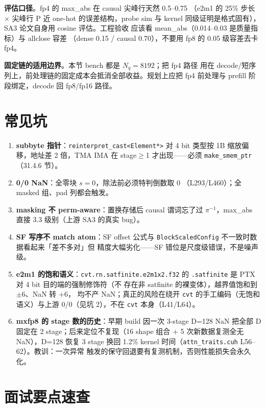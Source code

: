 \textbf{评估口径}。fp4 的 max\_abs 在 causal 尖峰行天然 0.5--0.75
（e2m1 的 25\% 步长 × 尖峰行 P 近 one-hot 的误差结构，probe sim 与
kernel 同级证明是格式固有），SA3 论文自身用 cosine 评估。工程验收
应该看 mean\_abs（0.014--0.03 是质量指标）与 allclose 容差
（dense 0.15 / causal 0.70），不要用 fp8 的 0.05 级容差去卡 fp4。

\textbf{固定链的适用边界}。本节 bench 都是 $N_q{=}8192$；把 fp4 路径
用在 decode/短序列上，前处理链的固定成本会抵消全部收益。规划上应把
fp4 前处理与 prefill 阶段绑定，decode 回 fp8/fp16 路径。

\section{常见坑}

\begin{enumerate}[itemsep=2pt,topsep=2pt]
  \item \textbf{subbyte 指针}：\texttt{reinterpret\_cast<Element*>} 对
        4 bit 类型按 1B 缩放偏移，地址差 2 倍，TMA IMA 在
        stage$\ge$1 才出现——必须 \texttt{make\_smem\_ptr}（31.4.6 节）。
  \item \textbf{0/0 NaN}：全零块 $s=0$，除法前必须特判倒数取 0
        （L293/L460）；全 masked 组、pad 列都会触发。
  \item \textbf{masking 不 perm-aware}：置换存储后 causal 谓词忘了过
        $\pi^{-1}$，max\_abs 直接 3.3 级别（上游 SA3 的真实 bug）。
  \item \textbf{SF 写序不 match atom}：SF offset 公式与
        \texttt{BlockScaledConfig} 不一致时数据看起来「差不多对」但
        精度大幅劣化——SF 错位是尺度级错误，不是噪声级。
  \item \textbf{e2m1 的饱和语义}：\texttt{cvt.rn.satfinite.e2m1x2.f32}
        的 \texttt{.satfinite} 是 PTX 对 4 bit 目的端的强制修饰符（不
        存在非 satfinite 的裸变体），越界值饱和到 $\pm$6、NaN 转 $+6$，
        均不产 NaN；真正的风险在绕开 \texttt{cvt} 的手工编码（无饱和
        语义）与上游 0/0（见坑 2），不在 \texttt{cvt} 本身（L41/L64）。
  \item \textbf{mxfp8 的 stage 数的历史}：早期 build 因一次 3-stage
        D=128 NaN 把全部 D 固定在 2 stage；后来定位不复现（16 shape 组合
        + 5 次新数据复测全无 NaN），D=128 恢复 3 stage 换回 1.2\% kernel
        时间（\texttt{attn\_traits.cuh} L56--62）。教训：一次异常
        触发的保守回退要有复测机制，否则性能损失会永久化。
\end{enumerate}

\section{面试要点速查}

